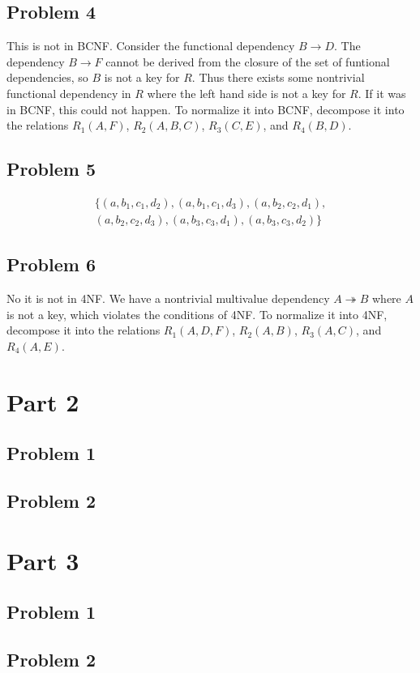 \documentclass[12pt]{article}
\begin{document}
\subsection*{Problem 4}

This is not in BCNF. Consider the functional dependency \(B\rightarrow D\). The dependency \(B\rightarrow F\) cannot be derived from the closure of the
set of funtional dependencies, so \(B\) is not a key for \(R\). Thus there exists some nontrivial functional dependency in \(R\) where the left hand side
is not a key for \(R\). If it was in BCNF, this could not happen. To normalize it into BCNF, decompose it into the relations \(R_1(A,F)\), \(R_2(A,B,C)\),
\(R_3(C,E)\), and \(R_4(B,D)\).

\subsection*{Problem 5}

\begin{multline*}
        \{(a,b_1,c_1,d_2),(a,b_1,c_1,d_3),(a,b_2,c_2,d_1),\\
        (a,b_2,c_2,d_3),(a,b_3,c_3,d_1),(a,b_3,c_3,d_2)\}
\end{multline*}

\subsection*{Problem 6}

No it is not in 4NF. We have a nontrivial multivalue dependency \(A\twoheadrightarrow B\) where \(A\) is not a key, which violates the
conditions of 4NF. To normalize it into 4NF, decompose it into the relations \(R_1(A,D,F)\), \(R_2(A,B)\), \(R_3(A,C)\), and \(R_4(A,E)\).

\section*{Part 2}

\subsection*{Problem 1}

\subsection*{Problem 2}

\section*{Part 3}

\subsection*{Problem 1}

\subsection*{Problem 2}
\end{document}
